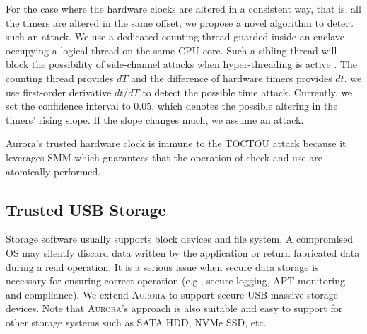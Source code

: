 \documentclass[journal,twocolumn,letterpaper,10pt]{IEEEtran}
\begin{document}
For the case where the hardware clocks are altered in a consistent way, that is, all the timers are altered in the same offset, we propose a novel algorithm to detect such an attack. We use a dedicated counting thread \cite{DBLP:conf/dimva/SchwarzWGMM17} guarded inside an enclave occupying a logical thread on the same CPU core. Such a sibling thread will block the possibility of side-channel attacks when hyper-threading is active \cite{DBLP:conf/sp/ChenWCCZWLL18}. The counting thread provides $dT$ and the difference of hardware timers provides $dt$, we use first-order derivative $dt/dT$ to detect the possible time attack. Currently, we set the confidence interval to 0.05, which denotes the possible altering in the timers' rising slope. If the slope changes much, we assume an attack.

Aurora's trusted hardware clock is immune to the TOCTOU attack because it leverages SMM which guarantees that the operation of check and use are atomically performed.

\subsection{Trusted USB Storage}\label{storage_service}
Storage software usually supports block devices and file system. A compromised OS may silently discard data written by the application or return fabricated data during a read operation. It is a serious issue when secure data storage is  necessary for ensuring correct operation (e.g., secure logging, APT monitoring and compliance). We extend \textsc{Aurora} to support secure USB massive storage devices. Note that \textsc{Aurora}'s approach is also suitable and easy to support for other storage systems such as SATA HDD, NVMe SSD, etc.

\end{document}
